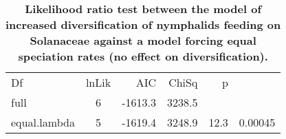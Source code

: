 \documentclass[10pt]{article}
\begin{document}
\begin{table}[!h]
    \caption{\bf{Likelihood ratio test between the model of increased
diversification of nymphalids feeding on Solanaceae against a model
forcing equal speciation rates (no effect on diversification).}}
\begin{tabular}{lcrrlr}
Df           & lnLik & AIC     & ChiSq  & \multicolumn{1}{r}{p} &         \\
full         & 6     & -1613.3 & 3238.5 &                       &         \\
equal.lambda & 5     & -1619.4 & 3248.9 & 12.3                  & 0.00045
\end{tabular}
\end{table}
\end{document}
